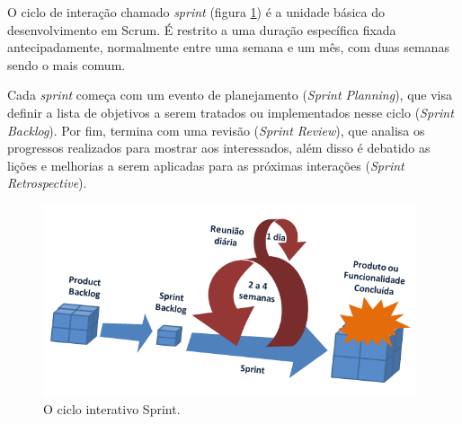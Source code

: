 \par O ciclo de interação chamado \emph{sprint} (figura \ref{fig:scrum_process}) é a unidade básica do desenvolvimento em Scrum. É restrito a uma duração específica fixada antecipadamente, normalmente entre uma semana e um mês, com duas semanas sendo o mais comum.
\par Cada \emph{sprint} começa com um evento de planejamento (\emph{Sprint Planning}), que visa definir a lista de objetivos a serem tratados ou implementados nesse ciclo (\emph{Sprint Backlog}). Por fim, termina com uma revisão (\emph{Sprint Review}), que analisa os progressos realizados para mostrar aos interessados, além disso é debatido as lições e melhorias a serem aplicadas para as próximas interações (\emph{Sprint Retrospective}).
\begin{figure}[!htb]
\centering
\includegraphics[width=11cm]{figuras/scrum_process}
\caption{\label{fig:scrum_process}O ciclo interativo Sprint.}
\end{figure}
